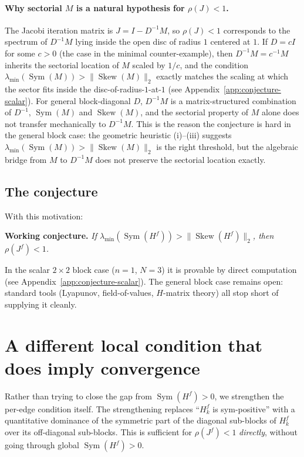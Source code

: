 \documentclass{article}
\newcommand{\Sym}{\operatorname{Sym}}
\newcommand{\Skew}{\operatorname{Skew}}
\begin{document}
\paragraph{Why sectorial $M$ is a natural hypothesis for $\rho(J) < 1$.}
The Jacobi iteration matrix is $J = I - D^{-1}M$, so $\rho(J) < 1$ corresponds
to the spectrum of $D^{-1}M$ lying inside the open disc of radius $1$ centered
at $1$. If $D = c I$ for some $c > 0$ (the case in the minimal counter-example),
then $D^{-1}M = c^{-1}M$ inherits the sectorial location of $M$ scaled by
$1/c$, and the condition $\lambda_{\min}(\Sym(M)) > \|\Skew(M)\|_2$ exactly
matches the scaling at which the sector fits inside the disc-of-radius-$1$-at-$1$
(see Appendix~\ref{app:conjecture-scalar}). For general block-diagonal $D$,
$D^{-1}M$ is a matrix-structured combination of $D^{-1}$, $\Sym(M)$ and
$\Skew(M)$, and the sectorial property of $M$ alone does not transfer
mechanically to $D^{-1}M$. This is the reason the conjecture is hard in the
general block case: the geometric heuristic (i)--(iii) suggests
$\lambda_{\min}(\Sym(M)) > \|\Skew(M)\|_2$ is the right threshold, but the
algebraic bridge from $M$ to $D^{-1}M$ does not preserve the sectorial location
exactly.

\subsection*{The conjecture}

With this motivation:

\medskip
\textbf{Working conjecture.}
\textit{If $\lambda_{\min}(\Sym(H^f)) > \|\Skew(H^f)\|_2$, then $\rho(J^f) < 1$.}
\medskip

In the scalar $2 \times 2$ block case ($n = 1$, $N = 3$) it is provable
by direct computation (see Appendix~\ref{app:conjecture-scalar}). The general
block case remains open: standard tools (Lyapunov, field-of-values, $H$-matrix
theory) all stop short of supplying it cleanly.

\section{A different local condition that does imply convergence}\label{sec:local-dominance}

Rather than trying to close the gap from $\Sym(H^f) > 0$, we strengthen the
per-edge condition itself. The strengthening replaces ``$H_k^f$ is sym-positive''
with a quantitative dominance of the symmetric part of the diagonal sub-blocks
of $H_k^f$ over its off-diagonal sub-blocks. This is sufficient for $\rho(J^f) < 1$
\emph{directly}, without going through global $\Sym(H^f) > 0$.
\end{document}
